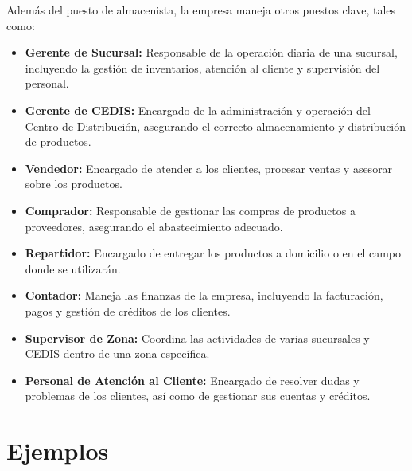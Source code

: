 \documentclass[
  letterpaper,
  DIV=11,
  numbers=noendperiod]{scrreprt}
\providecommand{\tightlist}{%
  \setlength{\itemsep}{0pt}\setlength{\parskip}{0pt}}\usepackage{longtable,booktabs,array}
\begin{document}
Además del puesto de almacenista, la empresa maneja otros puestos clave,
tales como:

\begin{itemize}
\tightlist
\item
  \textbf{Gerente de Sucursal:} Responsable de la operación diaria de
  una sucursal, incluyendo la gestión de inventarios, atención al
  cliente y supervisión del personal.
\item
  \textbf{Gerente de CEDIS:} Encargado de la administración y operación
  del Centro de Distribución, asegurando el correcto almacenamiento y
  distribución de productos.
\item
  \textbf{Vendedor:} Encargado de atender a los clientes, procesar
  ventas y asesorar sobre los productos.
\item
  \textbf{Comprador:} Responsable de gestionar las compras de productos
  a proveedores, asegurando el abastecimiento adecuado.
\item
  \textbf{Repartidor:} Encargado de entregar los productos a domicilio o
  en el campo donde se utilizarán.
\item
  \textbf{Contador:} Maneja las finanzas de la empresa, incluyendo la
  facturación, pagos y gestión de créditos de los clientes.
\item
  \textbf{Supervisor de Zona:} Coordina las actividades de varias
  sucursales y CEDIS dentro de una zona específica.
\item
  \textbf{Personal de Atención al Cliente:} Encargado de resolver dudas
  y problemas de los clientes, así como de gestionar sus cuentas y
  créditos.
\end{itemize}

\section{Ejemplos}\label{ejemplos}
\end{document}
